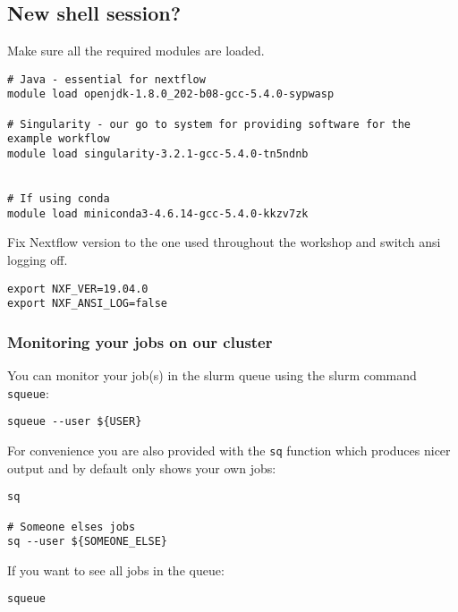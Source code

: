 \subsection{New shell session?}

Make sure all the required modules are loaded. 

\begin{steps}
\begin{lstlisting}
# Java - essential for nextflow
module load openjdk-1.8.0_202-b08-gcc-5.4.0-sypwasp 

# Singularity - our go to system for providing software for the example workflow
module load singularity-3.2.1-gcc-5.4.0-tn5ndnb


# If using conda 
module load miniconda3-4.6.14-gcc-5.4.0-kkzv7zk
\end{lstlisting}
\end{steps}


Fix Nextflow version to the one used throughout the workshop and switch ansi logging off.

\begin{steps}
\begin{lstlisting}
export NXF_VER=19.04.0
export NXF_ANSI_LOG=false
\end{lstlisting}
\end{steps}

\subsubsection{Monitoring your jobs on our cluster}

\begin{note}
You can monitor your job(s) in the slurm queue using the slurm command \texttt{squeue}:

\begin{lstlisting}
squeue --user ${USER}
\end{lstlisting}

For convenience you are also provided with the \texttt{sq} function which produces nicer output and by default only shows your own jobs:

\begin{lstlisting}
sq

# Someone elses jobs
sq --user ${SOMEONE_ELSE}
\end{lstlisting}

If you want to see all jobs in the queue:

\begin{lstlisting}
squeue
\end{lstlisting}

\end{note}

